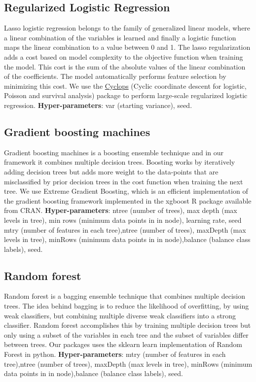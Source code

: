 \documentclass[11pt]{book}
\begin{document}
\subsection{Regularized Logistic
Regression}\label{regularized-logistic-regression}

Lasso logistic regression belongs to the family of generalized linear
models, where a linear combination of the variables is learned and
finally a logistic function maps the linear combination to a value
between 0 and 1. The lasso regularization adds a cost based on model
complexity to the objective function when training the model. This cost
is the sum of the absolute values of the linear combination of the
coefficients. The model automatically performs feature selection by
minimizing this cost. We use the
\href{https://ohdsi.github.io/Cyclops/}{Cyclops} (Cyclic coordinate
descent for logistic, Poisson and survival analysis) package to perform
large-scale regularized logistic regression. \textbf{Hyper-parameters}:
var (starting variance), seed.

\subsection{Gradient boosting
machines}\label{gradient-boosting-machines}

Gradient boosting machines is a boosting ensemble technique and in our
framework it combines multiple decision trees. Boosting works by
iteratively adding decision trees but adds more weight to the
data-points that are misclassified by prior decision trees in the cost
function when training the next tree. We use Extreme Gradient Boosting,
which is an efficient implementation of the gradient boosting framework
implemented in the xgboost R package available from CRAN.
\textbf{Hyper-parameters}: ntree (number of trees), max depth (max
levels in tree), min rows (minimum data points in in node), learning
rate, seed \textbar{} mtry (number of features in each tree),ntree
(number of trees), maxDepth (max levels in tree), minRows (minimum data
points in in node),balance (balance class labels), seed.

\subsection{Random forest}\label{random-forest}

Random forest is a bagging ensemble technique that combines multiple
decision trees. The idea behind bagging is to reduce the likelihood of
overfitting, by using weak classifiers, but combining multiple diverse
weak classifiers into a strong classifier. Random forest accomplishes
this by training multiple decision trees but only using a subset of the
variables in each tree and the subset of variables differ between trees.
Our packages uses the sklearn learn implementation of Random Forest in
python. \textbf{Hyper-parameters}: mtry (number of features in each
tree),ntree (number of trees), maxDepth (max levels in tree), minRows
(minimum data points in in node),balance (balance class labels), seed.
\end{document}

